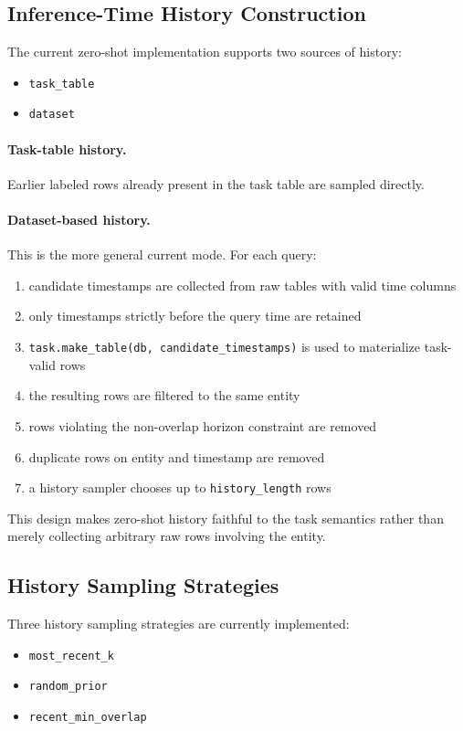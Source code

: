 \documentclass[11pt]{article}
\begin{document}
\subsection{Inference-Time History Construction}

The current zero-shot implementation supports two sources of history:
\begin{itemize}
\item \texttt{task\_table}
\item \texttt{dataset}
\end{itemize}

\paragraph{Task-table history.}
Earlier labeled rows already present in the task table are sampled directly.

\paragraph{Dataset-based history.}
This is the more general current mode. For each query:
\begin{enumerate}
\item candidate timestamps are collected from raw tables with valid time columns
\item only timestamps strictly before the query time are retained
\item \texttt{task.make\_table(db, candidate\_timestamps)} is used to materialize task-valid rows
\item the resulting rows are filtered to the same entity
\item rows violating the non-overlap horizon constraint are removed
\item duplicate rows on entity and timestamp are removed
\item a history sampler chooses up to \texttt{history\_length} rows
\end{enumerate}

This design makes zero-shot history faithful to the task semantics rather than merely collecting arbitrary raw rows involving the entity.

\subsection{History Sampling Strategies}

Three history sampling strategies are currently implemented:
\begin{itemize}
\item \texttt{most\_recent\_k}
\item \texttt{random\_prior}
\item \texttt{recent\_min\_overlap}
\end{itemize}
\end{document}
